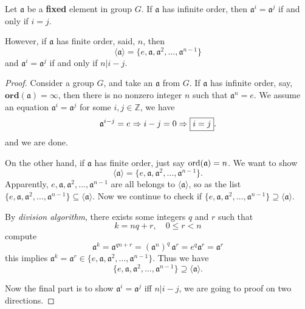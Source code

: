 \begin{theorem}
    Let $\mathfrak{a}$ be a \textbf{fixed} element in group $G$. If $\mathfrak{a}$ has infinite order, then $\mathfrak{a}^i = \mathfrak{a}^j$
    if and only if $i = j$.

    However, if $\mathfrak{a}$ has finite order, said, $n$, then 
    \begin{equation}
        \langle \mathfrak{a} \rangle = \{ e, \mathfrak{a}, \mathfrak{a}^2, \ldots, \mathfrak{a}^{n-1} \}
    \end{equation}
    and $\mathfrak{a}^i = \mathfrak{a}^j$
    if and only if $n | i - j$.
\end{theorem}
\begin{proof}
    Consider a group $G$, and take an $\mathfrak{a}$ from $G$. If $\mathfrak{a}$ has infinite order, say, 
    $\textbf{ord}(\mathfrak{a}) = \infty$, then there is no nonzero integer $n$ such that $\mathfrak{a}^n = e$.
    We assume an equation $\mathfrak{a}^i = \mathfrak{a}^j$ for some $i,j \in \mathbb{Z}$, we have 
    \[
        \mathfrak{a}^{i-j} = e \Rightarrow i - j = 0 \Rightarrow \fbox{$i = j$}.
    \]
    and we are done.

    On the other hand, if $\mathfrak{a}$ has finite order, just say $\operatorname{ord}(\mathfrak{a}) = n$. We want to show 
    \[
        \langle \mathfrak{a} \rangle = \{ e, \mathfrak{a}, \mathfrak{a}^2, \ldots, \mathfrak{a}^{n-1} \}.
    \]
    Apparently, $e, \mathfrak{a}, \mathfrak{a}^2, \ldots, \mathfrak{a}^{n-1}$ are all belongs to $\langle \mathfrak{a} \rangle$, so as the list 
    $\{ e, \mathfrak{a}, \mathfrak{a}^2, \ldots, \mathfrak{a}^{n-1} \} \subseteq \langle \mathfrak{a} \rangle$.
    Now we continue to check if $\{ e, \mathfrak{a}, \mathfrak{a}^2, \ldots, \mathfrak{a}^{n-1} \} \supseteq \langle \mathfrak{a} \rangle$.

    By \textit{division algorithm}, there exists some integers $q$ and $r$ such that 
    \[
        k = nq + r,\quad  0 \leq r < n
    \]
    compute 
    \[
        \mathfrak{a}^k = \mathfrak{a}^{qn+r} = (\mathfrak{a}^n)^{q}\, \mathfrak{a}^r = e^q \mathfrak{a}^r = \mathfrak{a}^r
    \]
    this implies $\mathfrak{a}^k = \mathfrak{a}^r \in \{ e, \mathfrak{a}, \mathfrak{a}^2, \ldots, \mathfrak{a}^{n-1} \}$. Thus we have 
    \[
        \{ e, \mathfrak{a}, \mathfrak{a}^2, \ldots, \mathfrak{a}^{n-1} \} \supseteq \langle \mathfrak{a} \rangle.
    \]

    Now the final part is to show $\mathfrak{a}^i = \mathfrak{a}^j$ iff $n|i-j$, we are going to proof on two directions.


\end{proof}
